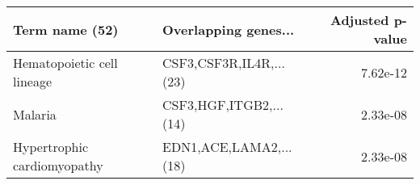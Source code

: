 \begin{tabular}{llr}
\toprule
             Term name (52) &    Overlapping genes... &  Adjusted p-value \\
\midrule
 Hematopoietic cell lineage & CSF3,CSF3R,IL4R,...(23) &          7.62e-12 \\
                    Malaria &  CSF3,HGF,ITGB2,...(14) &          2.33e-08 \\
Hypertrophic cardiomyopathy &  EDN1,ACE,LAMA2,...(18) &          2.33e-08 \\
\bottomrule
\end{tabular}

